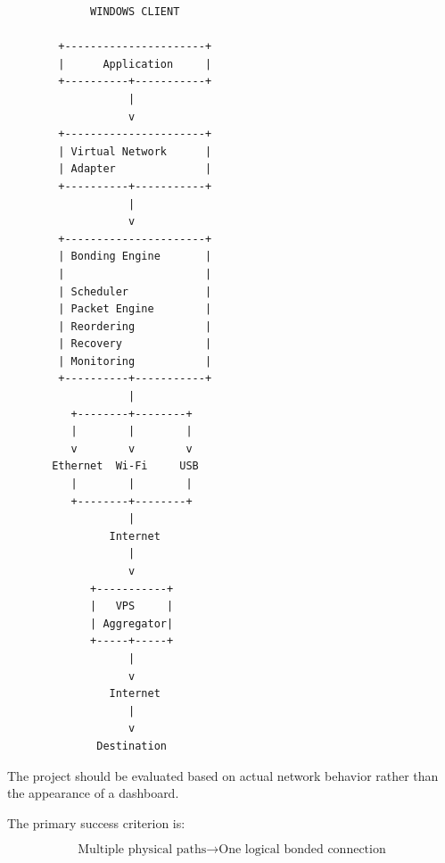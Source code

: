 \documentclass[12pt,a4paper]{article}
\begin{document}
\begin{verbatim}
             WINDOWS CLIENT

        +----------------------+
        |      Application     |
        +----------+-----------+
                   |
                   v
        +----------------------+
        | Virtual Network      |
        | Adapter              |
        +----------+-----------+
                   |
                   v
        +----------------------+
        | Bonding Engine       |
        |                      |
        | Scheduler            |
        | Packet Engine        |
        | Reordering           |
        | Recovery             |
        | Monitoring           |
        +----------+-----------+
                   |
          +--------+--------+
          |        |        |
          v        v        v
       Ethernet  Wi-Fi     USB
          |        |        |
          +--------+--------+
                   |
                Internet
                   |
                   v
             +-----------+
             |   VPS     |
             | Aggregator|
             +-----+-----+
                   |
                   v
                Internet
                   |
                   v
              Destination
\end{verbatim}

The project should be evaluated based on actual network behavior rather than the appearance of a dashboard.

The primary success criterion is:

\[
\boxed{
\text{Multiple physical paths}
\rightarrow
\text{One logical bonded connection}
}
\]
\end{document}
